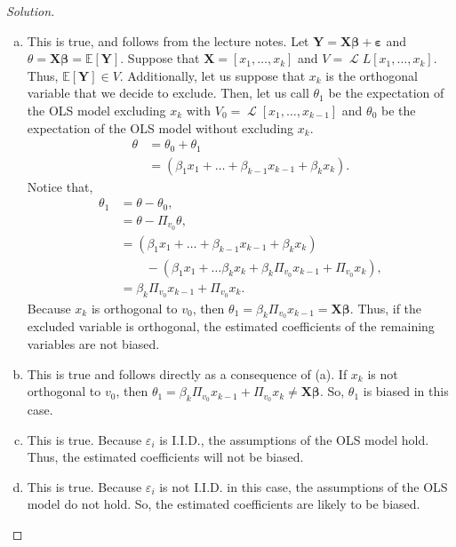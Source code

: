 \documentclass{amsart}\usepackage[]{graphicx}\usepackage[]{color}
\DeclareMathOperator{\Ell}{\mathscr{L}}
\newcommand{\ep}{\varepsilon}
\newcommand{\bvec}[1]{{\boldsymbol #1}}
\newcommand{\bbeta}{\bvec{\beta}}
\newcommand{\bX}{\bvec{X}}
\newcommand{\bY}{\bvec{Y}}
\begin{document}
			\begin{proof}[Solution] \
				\begin{enumerate}[(a)]
					\item This is true, and follows from the lecture notes.
					Let $\bY = \bX \bbeta + \bvec{\ep}$ and $\theta = \bX \bbeta = \mathbb{E}[\bY]$.
					Suppose that $\bX = [x_{1}, \dots, x_{k}]$ and $V = \Ell{L}[x_{1},\dots, x_{k}]$.
					Thus, $\mathbb{E}[\bY] \in V$.
					Additionally, let us suppose that $x_k$ is the orthogonal variable that we decide to exclude.
					Then, let us call $\theta_1$ be the expectation of the OLS model excluding $x_{k}$ with $V_{0} = \Ell[x_{1}, \dots, x_{k-1}]$ and $\theta_{0}$ be the expectation of the OLS model without excluding $x_{k}$.
					\begin{align*}
						\theta &= \theta_{0} + \theta_{1} \\
						&= (\beta_{1} x_{1} + \dots + \beta_{k-1}x_{k-1} + \beta_{k}x_{k}).
					\end{align*}
					Notice that,
					\begin{align*}
						\theta_{1} &= \theta - \theta_0, \\
						&= \theta - \Pi_{v_{0}} \theta,  \\
						&= (\beta_{1} x_{1} + \dots + \beta_{k-1}x_{k-1} + \beta_{k}x_{k}) \\
						&\hspace{25pt} -(\beta_1x_1+\dots \beta_{k}x_{k} + \beta_{k} \Pi_{v_{0}} x_{k-1} + \Pi_{v_{0}} x_{k}), \\
						&= \beta_{k} \Pi_{v_{0}} x_{k-1} + \Pi_{v_0}x_{k}.
					\end{align*}
					Because $x_{k}$ is orthogonal to $v_{0}$, then $\theta_{1} = \beta_{k} \Pi_{v_{0}} x_{k-1} = \bX \bbeta$.
					Thus, if the excluded variable is orthogonal, the estimated coefficients of the remaining variables are not biased.
					\item This is true and follows directly as a consequence of (a).
					If $x_{k}$ is not orthogonal to $v_{0}$, then $\theta_{1} = \beta_{k} \Pi_{v_{0}}x_{k-1} + \Pi_{v_{0}}x_{k} \neq \bX \bbeta$.
					So, $\theta_{1}$ is biased in this case.
					\item This is true.
					Because $\ep_{i}$ is I.I.D., the assumptions of the OLS model hold.
					Thus, the estimated coefficients will not be biased.
					\item This is true.
					Because $\ep_{i}$ is not I.I.D. in this case, the assumptions of the OLS model do not hold.
					So, the estimated coefficients are likely to be biased.
				\end{enumerate}

			\end{proof}
\end{document}
